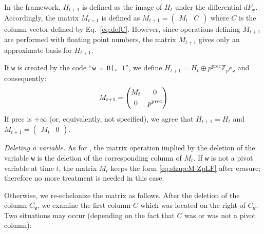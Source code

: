 \documentclass[sigconf]{acmart}
\newcommand{\ph}{\vphantom{$A^A_A$}}
\newcommand{\Z}{\mathbb Z}
\newcommand{\Zp}{\Z_p}
\newcommand{\ttv}{\texttt{v}\xspace}
\newcommand{\ttw}{\texttt{w}\xspace}
\newcommand{\ZpLC}{\text{\color{output} \rm \tt ZpLC}\xspace}
\newcommand{\ZpLF}{\text{\color{output} \rm \tt ZpLF}\xspace}
\theoremstyle{definition}
\begin{document}
In the \ZpLF framework, $H_{t+1}$ is defined as the image of $H_t$
under the differential $dF_{\underline x}$. Accordingly, the matrix
$M_{t+1}$ is defined as $M_{t+1} = \left(\begin{matrix}
M_t & C \end{matrix}\right)$
where $C$ is the column vector defined by Eq.~\eqref{eq:defC}.
However, since operations defining $M_{t+1}$ are performed with floating point numbers,
the matrix $M_{t+1}$ gives only an approximate basis for $H_{t+1}$.

\smallskip

If \ttw is created by the code
``\verb?w = ?\verb?R(?\verb?, ?\verb?)?'',
we define $H_{t+1} = H_t \oplus p^{\text{prec}} \Zp e_\ttw$ and consequently:
$$M_{t+1} = \left(\begin{matrix}
M_t & 0 \smallskip \\ 0 & p^{\text{prec}}
\end{matrix}\right)$$
If $\text{prec}$ is $+\infty$ (or, equivalently, not specified), we
agree that $H_{t+1} = H_t$ and $M_{t+1} = (\begin{matrix} M_t & 0 
\end{matrix})$.

\medskip

\noindent \textit{Deleting a variable.} 
% 
As for \ZpLC, the matrix operation implied by the deletion of the 
variable \ttw is the deletion of the corresponding column of $M_t$. If 
\ttw is not a pivot variable at time $t$, the matrix $M_t$ keeps the 
form \eqref{eq:shapeM-ZpLF} after erasure; therefore no more treatment 
is needed in this case.

Otherwise, we re-echelonize the matrix as follows. After the deletion 
of the column $C_\ttw$, we examine the first column $C$ which was 
located on the right of $C_\ttw$. Two situations may occur (depending
on the fact that $C$ was or was not a pivot column):

\noindent \hfill
{}
\hfill\null
\end{document}
